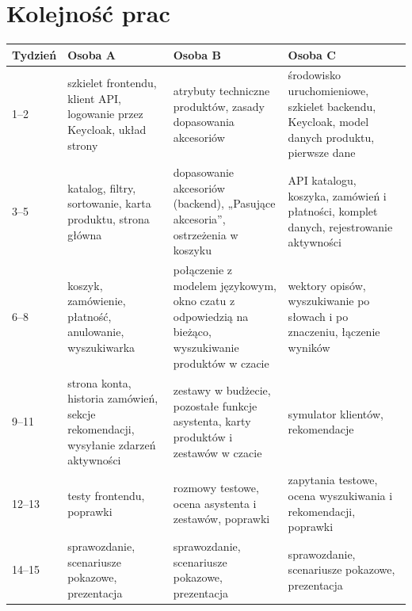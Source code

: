 \documentclass[11pt,a4paper]{article}
\begin{document}
\section{Kolejność prac}

{\footnotesize
\begin{tabularx}{\textwidth}{P{1.4cm}LLL}
\toprule
\textbf{Tydzień} & \textbf{Osoba A} & \textbf{Osoba B} & \textbf{Osoba C} \\
--2 & szkielet frontendu, klient API, logowanie przez Keycloak, układ strony & atrybuty techniczne
produktów, zasady dopasowania akcesoriów & środowisko uruchomieniowe, szkielet backendu, Keycloak, model
danych produktu, pierwsze dane \\
3--5 & katalog, filtry, sortowanie, karta produktu, strona główna & dopasowanie akcesoriów (backend),
„Pasujące akcesoria”, ostrzeżenia w koszyku & API katalogu, koszyka, zamówień i płatności, komplet danych,
rejestrowanie aktywności \\
6--8 & koszyk, zamówienie, płatność, anulowanie, wyszukiwarka & połączenie z modelem językowym, okno czatu
z odpowiedzią na bieżąco, wyszukiwanie produktów w czacie & wektory opisów, wyszukiwanie po słowach i po
znaczeniu, łączenie wyników \\
9--11 & strona konta, historia zamówień, sekcje rekomendacji, wysyłanie zdarzeń aktywności & zestawy
w budżecie, pozostałe funkcje asystenta, karty produktów i zestawów w czacie & symulator klientów,
rekomendacje \\
12--13 & testy frontendu, poprawki & rozmowy testowe, ocena asystenta i zestawów, poprawki & zapytania
testowe, ocena wyszukiwania i rekomendacji, poprawki \\
14--15 & sprawozdanie, scenariusze pokazowe, prezentacja & sprawozdanie, scenariusze pokazowe, prezentacja &
sprawozdanie, scenariusze pokazowe, prezentacja \\
\bottomrule
\end{tabularx}\par\medskip
}
\end{document}
